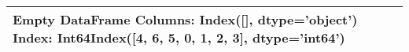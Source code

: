\begin{tabular}{l}
\toprule
Empty DataFrame
Columns: Index([], dtype='object')
Index: Int64Index([4, 6, 5, 0, 1, 2, 3], dtype='int64') \\
\bottomrule
\end{tabular}
